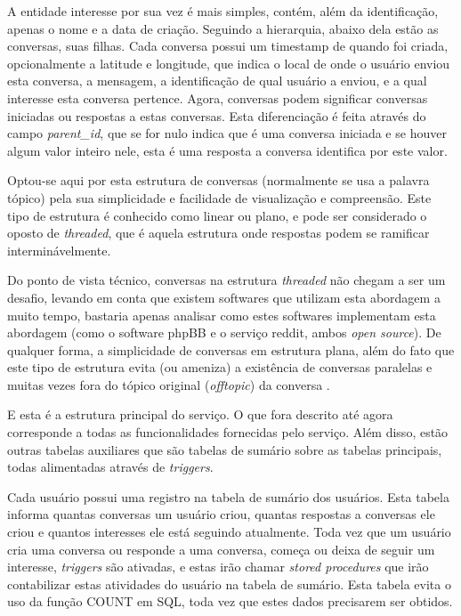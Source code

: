\documentclass[diss]{template/setrem}
\begin{document}
A entidade interesse por sua vez é mais simples, contém, além da identificação, apenas o nome e a data de criação. Seguindo a hierarquia, abaixo dela estão as conversas, suas filhas. Cada conversa possui um timestamp de quando foi criada, opcionalmente a latitude e longitude, que indica o local de onde o usuário enviou esta conversa, a mensagem, a identificação de qual usuário a enviou, e a qual interesse esta conversa pertence. Agora, conversas podem significar conversas iniciadas ou respostas a estas conversas. Esta diferenciação é feita através do campo \emph{parent\_id}, que se for nulo indica que é uma conversa iniciada e se houver algum valor inteiro nele, esta é uma resposta a conversa identifica por este valor.

Optou-se aqui por esta  estrutura de conversas (normalmente se usa a palavra tópico) pela sua simplicidade e facilidade de visualização e compreensão. Este tipo de estrutura é conhecido como linear ou plano, e pode ser considerado o oposto de \emph{threaded}, que é aquela estrutura onde respostas podem se ramificar interminávelmente.

Do ponto de vista técnico, conversas na estrutura \emph{threaded} não chegam a ser um desafio, levando em conta que existem softwares que utilizam esta abordagem a muito tempo, bastaria apenas analisar como estes softwares implementam esta abordagem (como o software phpBB e o serviço reddit, ambos \emph{open source}). De qualquer forma, a simplicidade de conversas em estrutura plana, além do fato que este tipo de estrutura evita (ou ameniza) a existência de conversas paralelas e muitas vezes fora do tópico original (\emph{offtopic}) da conversa \citep{Atwood2006}.

E esta é a estrutura principal do serviço. O que fora descrito até agora corresponde a todas as funcionalidades fornecidas pelo serviço. Além disso, estão outras tabelas auxiliares que são tabelas de sumário sobre as tabelas principais, todas alimentadas através de \emph{triggers}.

Cada usuário possui uma registro na tabela de sumário dos usuários. Esta tabela informa quantas conversas um usuário criou, quantas respostas a conversas ele criou e quantos interesses ele está seguindo atualmente. Toda vez que um usuário cria uma conversa ou responde a uma conversa, começa ou deixa de seguir um interesse, \emph{triggers} são ativadas, e estas irão chamar \emph{stored procedures} que irão contabilizar estas atividades do usuário na tabela de sumário. Esta tabela evita o uso da função COUNT em SQL, toda vez que estes dados precisarem ser obtidos.
\end{document}
